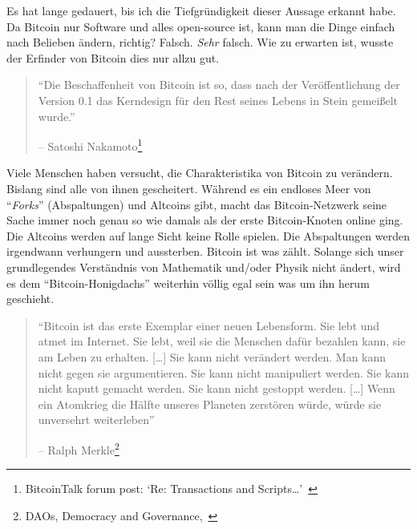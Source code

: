 Es hat lange gedauert, bis ich die Tiefgründigkeit dieser Aussage erkannt habe.
Da Bitcoin nur Software und alles open-source ist, kann man die Dinge einfach
nach Belieben ändern, richtig? Falsch. \textit{Sehr} falsch. Wie zu erwarten
ist, wusste der Erfinder von Bitcoin dies nur allzu gut.

\begin{quotation}\begin{samepage}
\enquote{Die Beschaffenheit von Bitcoin ist
so, dass nach der Veröffentlichung der Version 0.1 das Kerndesign für den Rest
seines Lebens in Stein gemeißelt wurde.} \begin{flushright} -- Satoshi
Nakamoto\footnote{BitcoinTalk forum post: `Re:
Transactions and Scripts\ldots'~\cite{satoshi-set-in-stone}}
\end{flushright}\end{samepage}\end{quotation}

Viele Menschen haben versucht, die Charakteristika von Bitcoin zu verändern.
Bislang sind alle von ihnen gescheitert. Während es ein endloses Meer von \enquote{\textit{Forks}}
(Abspaltungen) und Altcoins gibt, macht das Bitcoin-Netzwerk seine Sache immer
noch genau so wie damals als der erste Bitcoin-Knoten online ging. Die Altcoins
werden auf lange Sicht keine Rolle spielen. Die Abspaltungen werden irgendwann
verhungern und aussterben. Bitcoin ist was zählt. Solange sich unser
grundlegendes Verständnis von Mathematik und/oder Physik nicht ändert, wird es
dem “Bitcoin-Honigdachs” weiterhin völlig egal sein was um ihn herum geschieht.

\begin{quotation}\begin{samepage}
\enquote{Bitcoin ist das erste Exemplar einer neuen Lebensform. Sie lebt und
atmet im Internet. Sie lebt, weil sie die Menschen dafür bezahlen kann, sie am
Leben zu erhalten. [\ldots] Sie kann nicht verändert werden. Man kann nicht
gegen sie argumentieren. Sie kann nicht manipuliert werden. Sie kann nicht
kaputt gemacht werden. Sie kann nicht gestoppt werden. [\ldots] Wenn ein
Atomkrieg die Hälfte unseres Planeten zerstören würde, würde sie unversehrt
weiterleben}
\begin{flushright} -- Ralph Merkle\footnote{DAOs, Democracy and
Governance,~\cite{merkle-dao}}
\end{flushright}\end{samepage}\end{quotation}

